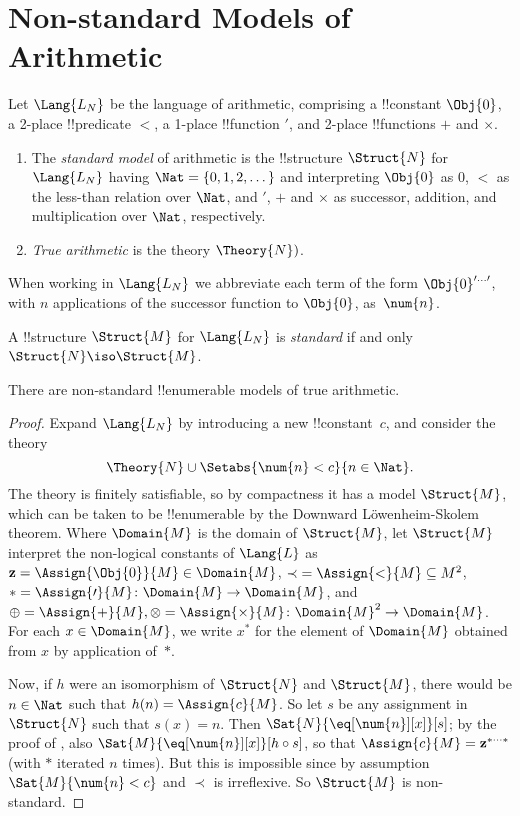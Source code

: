 \documentclass[../../include/open-logic-section]{subfiles}
\begin{document}
\section{Non-standard Models of Arithmetic}

\begin{defn}
Let $\Lang{L_N}$ be the language of arithmetic, comprising a
!!{constant} $\Obj{0}$, a 2-place !!{predicate} $<$, a 1-place
!!{function} $\prime$, and 2-place !!{function}s $+$ and $\times$.
\begin{enumerate}
\item The \emph{standard model} of arithmetic is the !!{structure}
  $\Struct{N}$ for $\Lang{L_N}$ having $\Nat = \{ 0, 1, 2, \dots\}$
  and interpreting $\Obj{0}$ as $0$, $<$ as the less-than relation
  over $\Nat$, and $\prime$, $+$ and $\times$ as successor, addition,
  and multiplication over $\Nat$, respectively.
\item \emph{True arithmetic} is the theory $\Theory{N})$.
\end{enumerate}
\end{defn}

When working in $\Lang{L_N}$ we abbreviate each term of
the form $\Obj{0}^{\prime\dots\prime}$, with $n$ applications of the
successor function to $\Obj{0}$, as~$\num{n}$.

\begin{defn}
A !!{structure} $\Struct{M}$ for $\Lang{L_N}$ is \emph{standard} if
and only $\Struct{N} \iso \Struct{M}$.
\end{defn}

\begin{thm}
There are non-standard !!{enumerable} models of true arithmetic.
\end{thm}

\begin{proof}
Expand $\Lang{L_N}$ by introducing a new !!{constant}~$c$, and
consider the theory
\[
\Theory{N} \cup \Setabs{\num{n} < c}{n \in \Nat}.
\]
The theory is finitely satisfiable, so by compactness it has a model
$\Struct{M}$, which can be taken to be !!{enumerable} by the Downward
L\"owenheim-Skolem theorem. Where $\Domain{M}$ is the domain of
$\Struct{M}$, let $\Struct{M}$ interpret the non-logical constants of
$\Lang{L}$ as $\mathbf{z} = \Assign{\Obj{0}}{M} \in \Domain{M}$, ${\prec} =
\Assign{<}{M} \subseteq M^2$, $* = \Assign{\prime}{M} \colon
\Domain{M} \to \Domain{M}$, and $\oplus = \Assign{+}{M}, \otimes =
\Assign{\times}{M} \colon \Domain{M}^2 \to \Domain{M}$. For each $x
\in \Domain{M}$, we write $x^*$ for the element of $\Domain{M}$
obtained from $x$ by application of~$*$.

Now, if $h$ were an isomorphism of $\Struct{N}$ and $\Struct{M}$,
there would be $n \in \Nat$ such that $h(n) = \Assign{c}{M}$.  So let
$s$ be any assignment in $\Struct{N}$ such that $s(x) = n$. Then
$\Sat{N}{\eq[\num{n}][x]}[s]$; by the proof of ,
also $\Sat{M}{\eq[\num{n}][x]}[h \circ s]$, so that $\Assign{c}{M} =
\mathbf{z}^{*\cdots *}$ (with $*$ iterated $n$ times). But this is impossible
since by assumption $\Sat{M}{\num{n} < c}$ and $\prec$ is
irreflexive. So $\Struct{M}$ is non-standard.
\end{proof}
\end{document}
